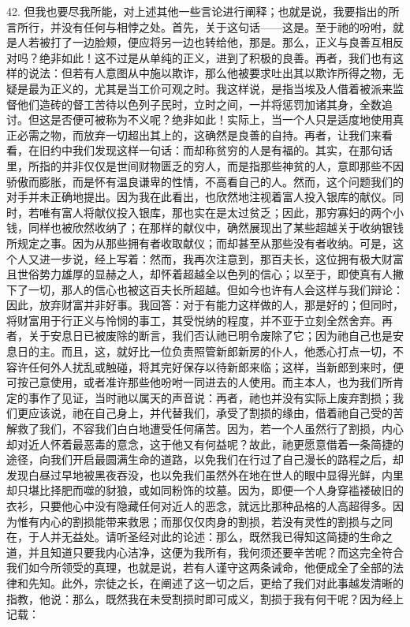 42. 但我也要尽我所能，对上述其他一些言论进行阐释；也就是说，我要指出的所言所行，并没有任何与相悖之处。首先，关于这句话——这是。至于祂的吩咐，就是人若被打了一边脸颊，便应将另一边也转给他，那是。那么，正义与良善互相反对吗？绝非如此！这不过是从单纯的正义，进到了积极的良善。再者，我们也有这样的说法：但若有人意图从中施以欺诈，那么他被要求吐出其以欺诈所得之物，无疑是最为正义的，尤其是当工价可观之时。我这样说，是指当埃及人借着被派来监督他们造砖的督工苦待以色列子民时，立时之间，一并将惩罚加诸其身，全数追讨。但这是否便可被称为不义呢？绝非如此！实际上，当一个人只是适度地使用真正必需之物，而放弃一切超出其上的，这确然是良善的自持。再者，让我们来看看，在旧约中我们发现这样一句话：而却称贫穷的人是有福的。其实，在那句话里，所指的并非仅仅是世间财物匮乏的穷人，而是指那些神贫的人，意即那些不因骄傲而膨胀，而是怀有温良谦卑的性情，不高看自己的人。然而，这个问题我们的对手并未正确地提出。因为我在此看出，也欣然地注视着富人投入银库的献仪。同时，若唯有富人将献仪投入银库，那也实在是太过贫乏；因此，那穷寡妇的两个小钱，同样也被欣然收纳了；在那样的献仪中，确然展现出了某些超越关于收纳银钱所规定之事。因为从那些拥有者收取献仪；而却甚至从那些没有者收纳。可是，这个人又进一步说，经上写着：然而，我再次注意到，那百夫长，这位拥有极大财富且世俗势力雄厚的显赫之人，却怀着超越全以色列的信心；以至于，即使真有人撇下了一切，那人的信心也被这百夫长所超越。但如今也许有人会这样与我们辩论：因此，放弃财富并非好事。我回答：对于有能力这样做的人，那是好的；但同时，将财富用于行正义与怜悯的事工，其受悦纳的程度，并不亚于立刻全然舍弃。再者，关于安息日已被废除的断言，我们否认祂已明令废除了它；因为祂自己也是安息日的主。而且，这，就好比一位负责照管新郎新房的仆人，他悉心打点一切，不容许任何外人扰乱或触碰，将其完好保存以待新郎来临；这样，当新郎到来时，便可按己意使用，或者准许那些他吩咐一同进去的人使用。而主本人，也为我们所肯定的事作了见证，当时祂以属天的声音说：再者，祂也并没有实际上废弃割损；我们更应该说，祂在自己身上，并代替我们，承受了割损的缘由，借着祂自己受的苦解救了我们，不容我们白白地遭受任何痛苦。因为，若一个人虽然行了割损，内心却对近人怀着最恶毒的意念，这于他又有何益呢？故此，祂更愿意借着一条简捷的途径，向我们开启最圆满生命的道路，以免我们在行过了自己漫长的路程之后，却发现白昼过早地被黑夜吞没，也以免我们虽然外在地在世人的眼中显得光鲜，内里却只堪比择肥而噬的豺狼，或如同粉饰的坟墓。因为，即便一个人身穿褴褛破旧的衣衫，只要他心中没有隐藏任何对近人的恶念，就远比那种品格的人高超得多。因为惟有内心的割损能带来救恩；而那仅仅肉身的割损，若没有灵性的割损与之同在，于人并无益处。请听圣经对此的论述：那么，既然我已得知这简捷的生命之道，并且知道只要我内心洁净，这便为我所有，我何须还要辛苦呢？而这完全符合我们如今所领受的真理，也就是说，若有人谨守这两条诫命，他便成全了全部的法律和先知。此外，宗徒之长，在阐述了这一切之后，更给了我们对此事越发清晰的指教，他说：那么，既然我在未受割损时即可成义，割损于我有何干呢？因为经上记载：